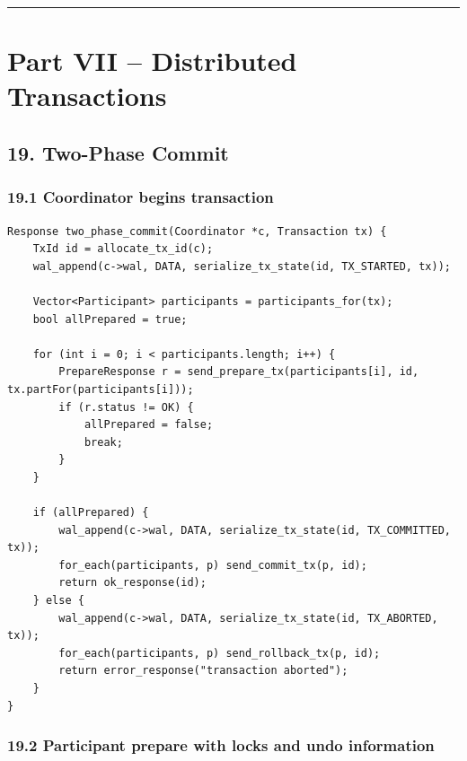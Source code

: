 \documentclass[10pt,letterpaper]{article}
\begin{document}
\medskip\hrule\medskip

\clearpage
\section*{Part VII -- Distributed Transactions}

\subsection*{19. Two-Phase Commit}

\subsubsection*{19.1 Coordinator begins transaction}

\begin{verbatim}
Response two_phase_commit(Coordinator *c, Transaction tx) {
    TxId id = allocate_tx_id(c);
    wal_append(c->wal, DATA, serialize_tx_state(id, TX_STARTED, tx));

    Vector<Participant> participants = participants_for(tx);
    bool allPrepared = true;

    for (int i = 0; i < participants.length; i++) {
        PrepareResponse r = send_prepare_tx(participants[i], id, tx.partFor(participants[i]));
        if (r.status != OK) {
            allPrepared = false;
            break;
        }
    }

    if (allPrepared) {
        wal_append(c->wal, DATA, serialize_tx_state(id, TX_COMMITTED, tx));
        for_each(participants, p) send_commit_tx(p, id);
        return ok_response(id);
    } else {
        wal_append(c->wal, DATA, serialize_tx_state(id, TX_ABORTED, tx));
        for_each(participants, p) send_rollback_tx(p, id);
        return error_response("transaction aborted");
    }
}
\end{verbatim}

\subsubsection*{19.2 Participant prepare with locks and undo information}
\end{document}
